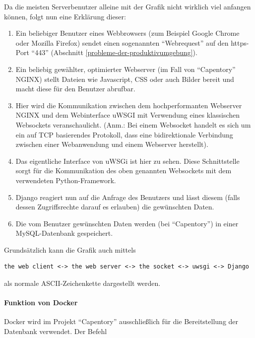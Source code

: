 Da die meisten Serverbenutzer alleine mit der Grafik nicht wirklich viel
anfangen können, folgt nun eine Erklärung dieser:

\begin{enumerate}
\def\labelenumi{\arabic{enumi}.}
\tightlist
\item
  Ein beliebiger Benutzer eines Webbrowsers (zum Beispiel Google Chrome
  oder Mozilla Firefox) sendet einen sogenannten ``Webrequest'' auf den
  https-Port ``443'' (Abschnitt \ref{probleme-der-produktivumgebung}).
\item
  Ein beliebig gewählter, optimierter Webserver (im Fall von
  ``Capentory'' NGINX) stellt Dateien wie Javascript, CSS oder auch
  Bilder bereit und macht diese für den Benutzer abrufbar.
\item
  Hier wird die Kommunikation zwischen dem hochperformanten Webserver
  NGINX und dem Webinterface uWSGI mit Verwendung eines klassischen
  Websockets veranschaulicht. (Anm.: Bei einem Websocket handelt es sich
  um ein auf TCP basierendes Protokoll, dass eine bidirektionale
  Verbindung zwischen einer Webanwendung und einem Webserver herstellt).
\item
  Das eigentliche Interface von uWSGi ist hier zu sehen. Diese
  Schnittstelle sorgt für die Kommunikation des oben genannten
  Websockets mit dem verwendeten Python-Framework.
\item
  Django reagiert nun auf die Anfrage des Benutzers und lässt diesem
  (falls dessen Zugriffsrechte darauf es erlauben) die gewünschten
  Daten.
\item
  Die vom Benutzer gewünschten Daten werden (bei ``Capentory'') in einer
  MySQL-Datenbank gespeichert.
\end{enumerate}

Grundsätzlich kann die Grafik auch mittels

\begin{verbatim}
the web client <-> the web server <-> the socket <-> uwsgi <-> Django
\end{verbatim}

als normale ASCII-Zeichenkette dargestellt werden.

\hypertarget{funktion-von-docker}{%
\paragraph{Funktion von Docker}\label{funktion-von-docker}}

Docker wird im Projekt ``Capentory'' ausschließlich für die
Bereitstellung der Datenbank verwendet. Der Befehl

